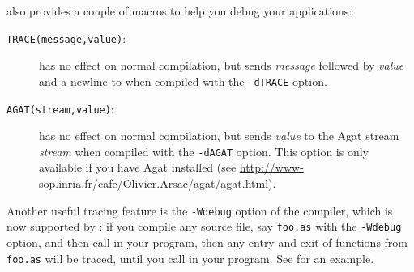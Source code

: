 \libaldor{} also provides a couple of macros to help you debug your
applications:
\begin{description}
\item[{\tt TRACE(message,value)}:] has no effect on normal compilation,
but sends {\em message} followed by {\em value} and a newline to
 when compiled with the {\tt -dTRACE} option.
\item[{\tt AGAT(stream,value)}:] has no effect on normal compilation,
but sends {\em value} to the Agat stream {\em stream} when compiled with
the {\tt -dAGAT} option. This option is only available if you have
Agat installed (see
\url{http://www-sop.inria.fr/cafe/Olivier.Arsac/agat/agat.html}).
\end{description}

Another useful tracing feature is the {\tt -Wdebug} option of the
compiler, which is now supported by \libaldor: if you compile
any source file, say {\tt foo.as}  with the {\tt -Wdebug} option,
and then call  in your program,
then any entry and exit of functions from {\tt foo.as} will be
traced, until you call  in your program.
See  for an example.

